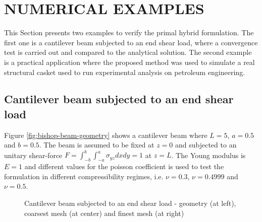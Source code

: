 \documentclass{wccm2024}
\begin{document}
\section{NUMERICAL EXAMPLES}

This Section presents two examples to verify the primal hybrid formulation. The first one is a cantilever beam subjected to an end shear load, where a convergence test is carried out and compared to the analytical solution. The second example is a practical application where the proposed method was used to simulate a real structural casket used to run experimental analysis on petroleum engineering.

\subsection{Cantilever beam subjected to an end shear load \label{subsec:bishop}}

Figure \ref{fig:bishop-beam-geometry} shows a cantilever beam where $L=5$, $a=0.5$ and $b=0.5$. The beam is assumed to be fixed at $z=0$ and subjected to an unitary shear-force $F=\int_{-b}^{b}\int_{-a}^{a}\sigma_{yz}dxdy=1$ at $z=L$. The Young modulus is $E=1$ and different values for the poisson coefficient is used to test the formulation in different compressibility regimes, i.e. $\nu=0.3$, $\nu=0.4999$ and $\nu=0.5$.

\begin{figure}[!htb]
	\centering
	 \hfill
     \hfill
	\caption{Cantilever beam subjected to an end shear load - geometry (at left), coarsest mesh (at center) and finest mesh (at right)}
	\label{fig:bishop-beam-problem}
\end{figure}
\end{document}
